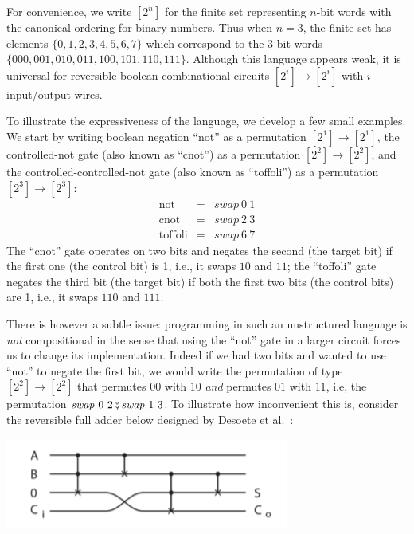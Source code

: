 \documentclass{article}
\begin{document}
For convenience, we write $[2^n]$ for the finite set representing
$n$-bit words with the canonical ordering for binary numbers. Thus
when $n=3$, the finite set has elements $\{0,1,2,3,4,5,6,7\}$ which
correspond to the 3-bit words $\{000,001,010,011,100,101,110,111\}$.
Although this language appears weak, it is universal for reversible
boolean combinational circuits $[2^i] \rightarrow [2^i]$ with $i$
input/output wires.

To illustrate the expressiveness of the language, we develop a few
small examples. We start by writing boolean negation ``not'' as a
permutation $[2^1] \rightarrow [2^1]$, the controlled-not gate (also
known as ``cnot'') as a permutation $[2^2] \rightarrow [2^2]$, and the
controlled-controlled-not gate (also known as ``toffoli'') as a
permutation $[2^3] \rightarrow [2^3]$:
\[\begin{array}{rcl}
\mbox{not} &=& \mathit{swap}~0~1 \\
\mbox{cnot} &=& \mathit{swap}~2~3 \\
\mbox{toffoli} &=& \mathit{swap}~6~7
\end{array}\]
The ``cnot'' gate operates on two bits and negates the second (the
target bit) if the first one (the control bit) is 1, i.e., it swaps
$10$ and $11$; the ``toffoli'' gate negates the third bit (the target
bit) if both the first two bits (the control bits) are 1, i.e., it
swaps $110$ and $111$.

There is however a subtle issue: programming in such an unstructured
language is \emph{not} compositional in the sense that using the
``not'' gate in a larger circuit forces us to change its
implementation. Indeed if we had two bits and wanted to use ``not'' to
negate the first bit, we would write the permutation of type
$[2^2] \rightarrow [2^2]$ that permutes $00$ with $10$ \emph{and}
permutes $01$ with $11$, i.e, the permutation
$\mathit{swap}~0~2 \fatsemi \mathit{swap}~1~3$. To illustrate
how inconvenient this is, consider the reversible full adder
below designed by Desoete et al.~\cite{117414}:

\begin{center}
\includegraphics[scale=0.6]{full-adder.png}
\end{center}
\end{document}
